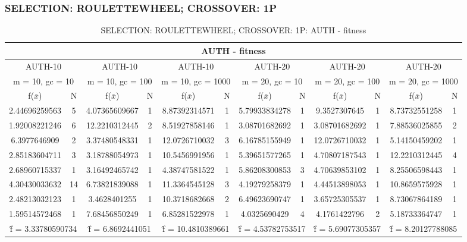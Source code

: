 \subsubsection{SELECTION: ROULETTEWHEEL; CROSSOVER: 1P}
\begin{table}[H]
	\centering
	\caption{SELECTION: ROULETTEWHEEL; CROSSOVER: 1P: AUTH - fitness}
	\begin{adjustbox}{width=1\textwidth}
		\begin{tabular}{ |c|c||c|c||c|c||c|c||c|c||c|c| }
			\hline
			\multicolumn{12}{|c|}{AUTH - fitness} \\
			\hline
			\multicolumn{2}{|c||}{AUTH-10} & \multicolumn{2}{c||}{AUTH-10} & \multicolumn{2}{c||}{AUTH-10} & \multicolumn{2}{c||}{AUTH-20} & \multicolumn{2}{c||}{AUTH-20} & \multicolumn{2}{c|}{AUTH-20}\\
			\hline
			\multicolumn{2}{|c||}{m = 10, gc = 10} & \multicolumn{2}{c||}{m = 10, gc = 100} & \multicolumn{2}{c||}{m = 10, gc = 1000} & \multicolumn{2}{c||}{m = 20, gc = 10} & \multicolumn{2}{c||}{m = 20, gc = 100} & \multicolumn{2}{c|}{m = 20, gc = 1000}\\
			\hline
			f($\bar{x}$) & N & f($\bar{x}$) & N & f($\bar{x}$) & N & f($\bar{x}$) & N & f($\bar{x}$) & N & f($\bar{x}$) & N\\
			\hline
			\hline
			2.44696259563 & 5 & 4.07365609667 & 1 & 8.87392314571 & 1 & 5.79933834278 & 1 & 9.3527307645 & 1 & 8.73732551258 & 1\\
			1.92008221246 & 6 & 12.2210312445 & 2 & 8.51927858146 & 1 & 3.08701682692 & 1 & 3.08701682692 & 1 & 7.88536025855 & 2\\
			6.3977646909 & 2 & 3.37480548331 & 1 & 12.0726710032 & 3 & 6.16785155949 & 1 & 12.0726710032 & 1 & 5.14150459202 & 1\\
			2.85183604711 & 3 & 3.18788054973 & 1 & 10.5456991956 & 1 & 5.39651577265 & 1 & 4.70807187543 & 1 & 12.2210312445 & 4\\
			2.68960715337 & 1 & 3.16492465742 & 1 & 4.38747581522 & 1 & 5.86208300853 & 3 & 4.70639853102 & 1 & 8.25506598443 & 1\\
			4.30430033632 & 14 & 6.73821839088 & 1 & 11.3364545128 & 3 & 4.19279258379 & 1 & 4.44513898053 & 1 & 10.8659575928 & 1\\
			2.48213032123 & 1 & 3.4628401255 & 1 & 10.3718682668 & 2 & 6.49623690747 & 1 & 3.65725305537 & 1 & 8.73067864189 & 1\\
			1.59514572468 & 1 & 7.68456850249 & 1 & 6.85281522978 & 1 & 4.0325690429 & 4 & 4.1761422796 & 2 & 5.18733364747 & 1\\
			\hline
			\multicolumn{2}{|c||}{\^{f} = 3.33780590734} & \multicolumn{2}{c||}{\^{f} = 6.8692441051} & \multicolumn{2}{c||}{\^{f} = 10.4810389661} & \multicolumn{2}{c||}{\^{f} = 4.53782753517} & \multicolumn{2}{c||}{\^{f} = 5.69077305357} & \multicolumn{2}{c|}{\^{f} = 8.20127788085}\\
			\hline
		\end{tabular}
	\end{adjustbox}
\end{table}
